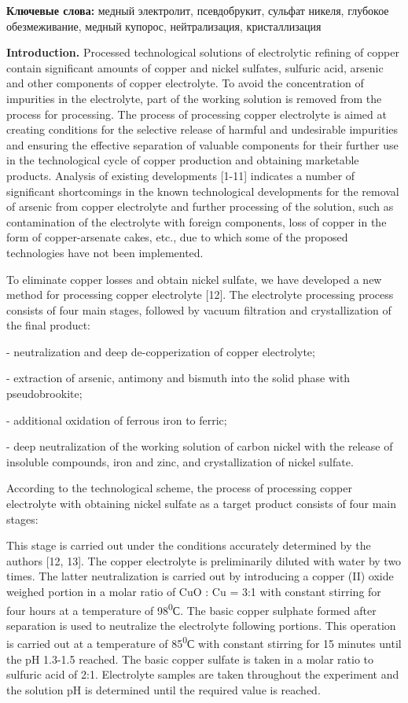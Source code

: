 {\bfseries Ключевые слова:} медный электролит, псевдобрукит, сульфат
никеля, глубокое обезмеживание, медный купорос, нейтрализация,
кристаллизация

\begin{multicols}{2}
{\bfseries Introduction.} Processed technological solutions of electrolytic
refining of copper contain significant amounts of copper and nickel
sulfates, sulfuric acid, arsenic and other components of copper
electrolyte. To avoid the concentration of impurities in the
electrolyte, part of the working solution is removed from the process
for processing. The process of processing copper electrolyte is aimed at
creating conditions for the selective release of harmful and undesirable
impurities and ensuring the effective separation of valuable components
for their further use in the technological cycle of copper production
and obtaining marketable products. Analysis of existing developments
{[}1-11{]} indicates a number of significant shortcomings in the known
technological developments for the removal of arsenic from copper
electrolyte and further processing of the solution, such as
contamination of the electrolyte with foreign components, loss of copper
in the form of copper-arsenate cakes, etc., due to which some of the
proposed technologies have not been implemented.

To eliminate copper losses and obtain nickel sulfate, we have developed
a new method for processing copper electrolyte {[}12{]}. The electrolyte
processing process consists of four main stages, followed by vacuum
filtration and crystallization of the final product:

- neutralization and deep de-copperization of copper electrolyte;

- extraction of arsenic, antimony and bismuth into the solid phase with
pseudobrookite;

- additional oxidation of ferrous iron to ferric;

- deep neutralization of the working solution of carbon nickel with the
release of insoluble compounds, iron and zinc, and crystallization of
nickel sulfate.

According to the technological scheme, the process of processing copper
electrolyte with obtaining nickel sulfate as a target product consists
of four main stages:

This stage is carried out under the conditions accurately determined by
the authors {[}12, 13{]}. The copper electrolyte is preliminarily
diluted with water by two times. The latter neutralization is carried
out by introducing a copper (II) oxide weighed portion in a molar ratio
of CuO : Cu = 3:1 with constant stirring for four hours at a temperature
of 98\textsuperscript{0}С. The basic copper sulphate formed after
separation is used to neutralize the electrolyte following portions.
This operation is carried out at a temperature of 85\textsuperscript{0}С
with constant stirring for 15 minutes until the pH 1.3-1.5 reached. The
basic copper sulfate is taken in a molar ratio to sulfuric acid of 2:1.
Electrolyte samples are taken throughout the experiment and the solution
pH is determined until the required value is reached.


\end{multicols}
